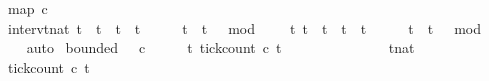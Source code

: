 \begin{isabellebody}
\ {\isacartoucheopen}map\ c{}\ {\isacharbrackleft}{}{\isacharcomma}{}{\isacharcomma}{}{\isacharcomma}{}{\isacharcomma}{}{\isacharcomma}{}{\isacharcomma}{}{\isacharcomma}{}{\isacharcomma}{}{\isacharcomma}{}{\isacharcomma}{}{}{\isacharbrackright}{\isacartoucheclose}\isanewline
\isanewline
{}\isamarkupfalse%
\ interv{\isacharunderscore}{}{\isacharcolon}{\isacartoucheopen}{\isacharbraceleft}t{\isacharcolon}{\isacharcolon}nat{\isachardot}\ t\ {\isasymle}\ t\ {\isasymand}\ t\ {\isacharless}\ t\ {\isacharplus}\ {}\ {\isasymand}\ {}\ {\isasymle}\ t\ {\isasymand}\ {\isacharparenleft}t\ {\isacharminus}\ {}{\isacharparenright}\ mod\ {}\ {\isacharequal}\ {}{\isacharbraceright}\ {\isacharequal}\ {\isacharbraceleft}t{\isachardot}\ {\isacharparenleft}t\ {\isacharequal}\ t\ {\isasymor}\ t\ {\isacharequal}\ t\ {\isacharplus}\ {}{\isacharparenright}\ {\isasymand}\ {}\ {\isasymle}\ t\ {\isasymand}\ {\isacharparenleft}t\ {\isacharminus}\ {}{\isacharparenright}\ mod\ {}\ {\isacharequal}\ {}{\isacharbraceright}{\isacartoucheclose}\isanewline
%
\isadelimproof
\ \ %
\endisadelimproof
%
\isatagproof
{}\isamarkupfalse%
\ auto%
\endisatagproof
{\isafoldproof}%
%
\isadelimproof
\isanewline
%
\endisadelimproof
\isanewline
{}\isamarkupfalse%
\ {\isacartoucheopen}bounded\ {}\ {}\ c{}{\isacartoucheclose}\isanewline
%
\isadelimproof
%
\endisadelimproof
%
\isatagproof
{}\isamarkupfalse%
\ {\isacharminus}\isanewline
\ \ \isamarkupfalse%
\ {\isacartoucheopen}{\isasymforall}t{\isachardot}\ tick{\isacharunderscore}count\ c{}\ t\ {}\ {\isasymle}\ {}{\isacartoucheclose}\isanewline
\ \ \isamarkupfalse%
\ {\isacharminus}\isanewline
\ \ \ \ \isacommand{{\isacharbraceleft}}\isamarkupfalse%
\ \isamarkupfalse%
\ tnat\isanewline
\ \ \ \ \ \ \isamarkupfalse%
\ {\isacartoucheopen}tick{\isacharunderscore}count\ c{}\ t\ {}\ {\isasymle}\ {}{\isacartoucheclose}\isanewline
\ \ \ \ \ \ \isamarkupfalse%

\end{isabellebody}
